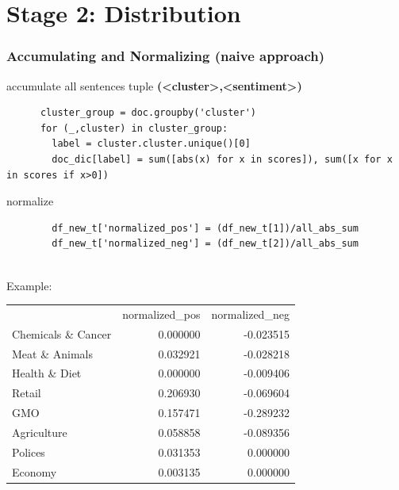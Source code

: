 \documentclass{tum-presentation}
\begin{document}
\section{Stage 2: Distribution}
\begin{frame}[fragile]
  \frametitle{Accumulating and Normalizing (naive approach)}
  \begin{description}
    \large

    \item accumulate all sentences tuple \textbf{(<cluster>,<sentiment>)}
    \begin{lstlisting}
      cluster_group = doc.groupby('cluster')
      for (_,cluster) in cluster_group:
        label = cluster.cluster.unique()[0]
        doc_dic[label] = sum([abs(x) for x in scores]), sum([x for x in scores if x>0])
      \end{lstlisting}
      \item normalize
    
      \begin{lstlisting}
        df_new_t['normalized_pos'] = (df_new_t[1])/all_abs_sum
        df_new_t['normalized_neg'] = (df_new_t[2])/all_abs_sum
  
    \end{lstlisting}
    \item Example:
    \small
    \begin{tabular}{lrr}
    
      {} &  normalized\_pos &  normalized\_neg \\
     
      Chemicals \& Cancer &        0.000000 &       -0.023515 \\
      Meat \& Animals     &        0.032921 &       -0.028218 \\
      Health \& Diet      &        0.000000 &       -0.009406 \\
      Retail             &        0.206930 &       -0.069604 \\
      GMO                &        0.157471 &       -0.289232 \\
      Agriculture        &        0.058858 &       -0.089356 \\
      Polices            &        0.031353 &        0.000000 \\
      Economy            &        0.003135 &        0.000000 \\
      
      \end{tabular}
  \end{description}
\end{frame}
\end{document}
